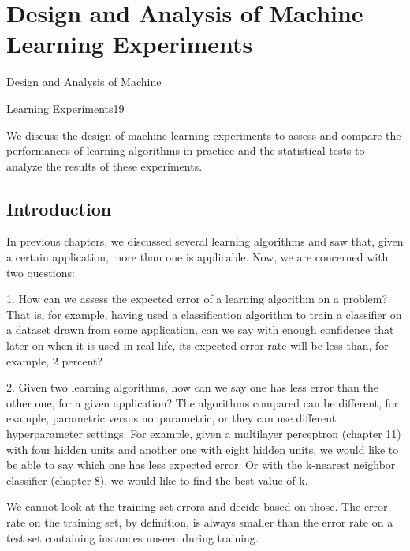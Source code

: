 \chapter{Design and Analysis of Machine Learning Experiments}
\label{chap:19-machine-learning-experiments}

Design and Analysis of Machine

Learning Experiments19

We discuss the design of machine learning experiments to assess and compare the performances of learning algorithms in practice and the statistical tests to analyze the results of these experiments.

\section{Introduction}

In previous chapters, we discussed several learning algorithms and saw that, given a certain application, more than one is applicable. Now, we are concerned with two questions:

1. How can we assess the expected error of a learning algorithm on a problem? That is, for example, having used a classification algorithm to train a classifier on a dataset drawn from some application, can we say with enough confidence that later on when it is used in real life, its expected error rate will be less than, for example, 2 percent?

2. Given two learning algorithms, how can we say one has less error than the other one, for a given application? The algorithms compared can be different, for example, parametric versus nonparametric, or they can use different hyperparameter settings. For example, given a multilayer perceptron (chapter 11) with four hidden units and another one with eight hidden units, we would like to be able to say which one has less expected error. Or with the k-nearest neighbor classifier (chapter 8), we would like to find the best value of k.

We cannot look at the training set errors and decide based on those. The error rate on the training set, by definition, is always smaller than the error rate on a test set containing instances unseen during training.

